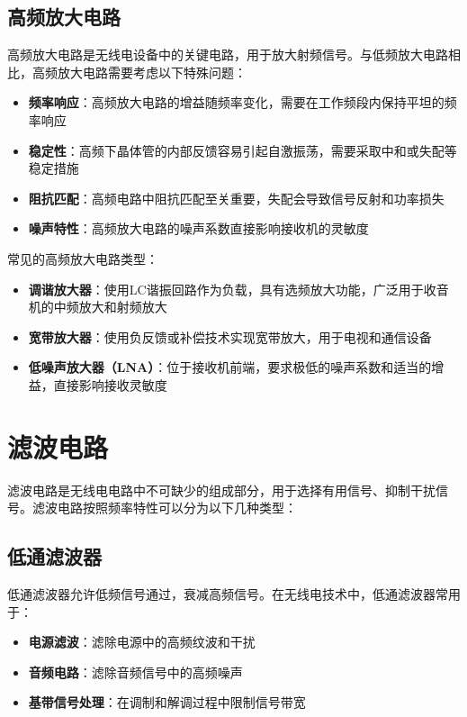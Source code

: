\documentclass[12pt,UTF8]{ctexbook}
\begin{document}
\subsection{高频放大电路}

高频放大电路是无线电设备中的关键电路，用于放大射频信号。与低频放大电路相比，高频放大电路需要考虑以下特殊问题：

\begin{itemize}[leftmargin=3.5em]
    \item \textbf{频率响应}：高频放大电路的增益随频率变化，需要在工作频段内保持平坦的频率响应
    \item \textbf{稳定性}：高频下晶体管的内部反馈容易引起自激振荡，需要采取中和或失配等稳定措施
    \item \textbf{阻抗匹配}：高频电路中阻抗匹配至关重要，失配会导致信号反射和功率损失
    \item \textbf{噪声特性}：高频放大电路的噪声系数直接影响接收机的灵敏度
\end{itemize}

常见的高频放大电路类型：
\begin{itemize}[leftmargin=3.5em]
    \item \textbf{调谐放大器}：使用LC谐振回路作为负载，具有选频放大功能，广泛用于收音机的中频放大和射频放大
    \item \textbf{宽带放大器}：使用负反馈或补偿技术实现宽带放大，用于电视和通信设备
    \item \textbf{低噪声放大器（LNA）}：位于接收机前端，要求极低的噪声系数和适当的增益，直接影响接收灵敏度
\end{itemize}

\section{滤波电路}

滤波电路是无线电电路中不可缺少的组成部分，用于选择有用信号、抑制干扰信号。滤波电路按照频率特性可以分为以下几种类型：

\subsection{低通滤波器}

低通滤波器允许低频信号通过，衰减高频信号。在无线电技术中，低通滤波器常用于：

\begin{itemize}[leftmargin=3.5em]
    \item \textbf{电源滤波}：滤除电源中的高频纹波和干扰
    \item \textbf{音频电路}：滤除音频信号中的高频噪声
    \item \textbf{基带信号处理}：在调制和解调过程中限制信号带宽
\end{itemize}
\end{document}

